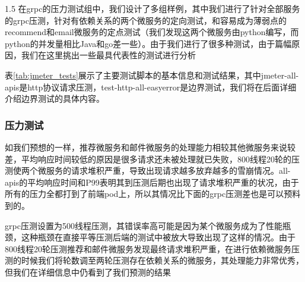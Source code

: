 \documentclass[a4paper,12pt]{report}
\begin{document}
\begin{spacing}{1.5}
在grpc的压力测试组中，我们设计了多组样例，其中我们进行了针对全部服务的grpc压测，针对有依赖关系的两个微服务的定向测试，和容易成为薄弱点的recommend和email微服务的定点测试（我们发现这两个微服务由python编写，而python的并发量相比Java和go差一些）。由于我们进行了很多种测试，由于篇幅原因，我们在这里挑出一些最具代表性的测试进行分析

\begin{table}[htbp]
	\centering
	\caption{JMeter 压测脚本详情（部分）}
	\label{tab:jmeter_tests}
\end{table}
表\ref{tab:jmeter_tests}展示了主要测试脚本的基本信息和测试结果，其中jmeter-all-apis是http协议请求压测，test-http-all-easyerror是边界测试，我们将在后面详细介绍边界测试的具体内容。
\subsubsection{压力测试}

如我们预想的一样，推荐微服务和邮件微服务的处理能力相较其他微服务来说较差，平均响应时间较低的原因是很多请求还未被处理就已失败，800线程20轮的压测使两个微服务的请求堆积严重，导致出现请求越多放弃越多的雪崩情况。all-apis的平均响应时间和P99表明其到压测后期也出现了请求堆积严重的状况，由于所有的压力全都打到了前端pod上，所以其情况比下面的grpc压测差也是可以预料到的。

grpc压测设置为500线程压测，其错误率高可能是因为某个微服务成为了性能瓶颈，这种瓶颈在直接平等压测后端的测试中被放大导致出现了这样的情况。由于800线程20轮压测推荐和邮件微服务发现最终请求堆积严重，在进行依赖微服务压测的时候我们将轮数调至两轮压测存在依赖关系的微服务，其处理能力非常优秀，但我们在详细信息中仍看到了我们预测的结果


\end{spacing}
\end{document}
